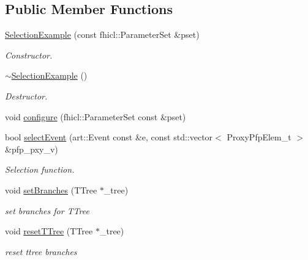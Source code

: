 \subsection*{Public Member Functions}
\begin{DoxyCompactItemize}
\item 
\hyperlink{classselection_1_1SelectionExample_a14d995ca3f3beda222bf5eb514fde63f}{Selection\-Example} (const fhicl\-::\-Parameter\-Set \&pset)
\begin{DoxyCompactList}\small\item\em Constructor. \end{DoxyCompactList}\item 
\hypertarget{classselection_1_1SelectionExample_a23080e1af959ccac8b922ebae7dd1d73}{\hyperlink{classselection_1_1SelectionExample_a23080e1af959ccac8b922ebae7dd1d73}{$\sim$\-Selection\-Example} ()}\label{classselection_1_1SelectionExample_a23080e1af959ccac8b922ebae7dd1d73}

\begin{DoxyCompactList}\small\item\em Destructor. \end{DoxyCompactList}\item 
void \hyperlink{classselection_1_1SelectionExample_a93e07083284b112e1881aca28a4205aa}{configure} (fhicl\-::\-Parameter\-Set const \&pset)
\item 
bool \hyperlink{classselection_1_1SelectionExample_a25a0971c86e5b6fb2ce51c16c0a58f9e}{select\-Event} (art\-::\-Event const \&e, const std\-::vector$<$ Proxy\-Pfp\-Elem\-\_\-t $>$ \&pfp\-\_\-pxy\-\_\-v)
\begin{DoxyCompactList}\small\item\em Selection function. \end{DoxyCompactList}\item 
\hypertarget{classselection_1_1SelectionExample_a6d40ae8dec191b9985338aed2047b1ec}{void \hyperlink{classselection_1_1SelectionExample_a6d40ae8dec191b9985338aed2047b1ec}{set\-Branches} (T\-Tree $\ast$\-\_\-tree)}\label{classselection_1_1SelectionExample_a6d40ae8dec191b9985338aed2047b1ec}

\begin{DoxyCompactList}\small\item\em set branches for T\-Tree \end{DoxyCompactList}\item 
\hypertarget{classselection_1_1SelectionExample_aeca20c0b0258d6a31bf563a9c9728595}{void \hyperlink{classselection_1_1SelectionExample_aeca20c0b0258d6a31bf563a9c9728595}{reset\-T\-Tree} (T\-Tree $\ast$\-\_\-tree)}\label{classselection_1_1SelectionExample_aeca20c0b0258d6a31bf563a9c9728595}

\begin{DoxyCompactList}\small\item\em reset ttree branches \end{DoxyCompactList}\end{DoxyCompactItemize}
